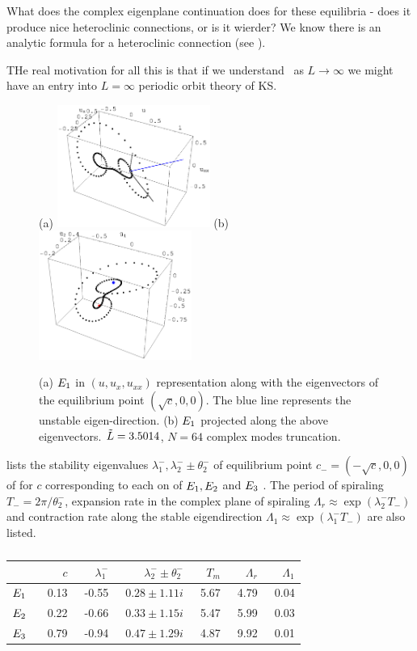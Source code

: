 What does the complex eigenplane continuation does for these
equilibria - does it produce nice heteroclinic connections, or is it
wierder? We know there is an analytic formula for a heteroclinic
connection (see ). %

THe real motivation for all this is that if we understand \eqva\ as
$L \to \infty$ we might have an entry into $L = \infty$ periodic orbit
theory of KS.

\begin{figure}[h]
\centering
(a) \includegraphics[width=5.0cm]{figs/1wSteadyE.eps}
\hspace{0.1in}
(b) \includegraphics[width=5.0cm]{figs/1wSteadyP.eps}
\caption{ 
\small{
(a) $E_{1}$ in $(u,u_x,u_{xx})$ representation along with the eigenvectors of the equilibrium
point $(\sqrt{c},0,0)$. The blue line represents the unstable eigen-direction.
(b) $E_{1}$ projected along the above eigenvectors. $\tilde{L}=3.5014$, $N=64$ complex modes truncation.
}
}
\label{f:1wSteady}
\end{figure}

 lists the stability eigenvalues
$\lambda^-_1,\lambda^-_2\pm\theta^-_2$ of equilibrium point $c_{-}=(-\sqrt{c},0,0)$ 
of \label{eq:3dks} for $c$ corresponding to each on of $E_{1},E_{2}$ and $E_{3}$ \eqva. 
The period of spiraling $T_{-}=2\pi/\theta^-_2$, expansion
rate in the complex plane of spiraling $\Lambda_r\approx\exp(\lambda_2^- T_-)$ and contraction
rate along the stable eigendirection $\Lambda_1\approx\exp(\lambda_1^- T_-)$ are also listed.

\begin{table}[h!]
	\begin{tabular}{l|rrrrrr}
				& $c$	&$\lambda^-_1$	& $\lambda^-_2\pm\theta^-_2$	& $T_m$	& $\Lambda_r$ 	& $\Lambda_1$	\\ \hline
		$\EQV{1}\ $	&\ 0.13	&\ -0.55	&\ $0.28\pm1.11i$		&\ 5.67 	&\ 4.79	 	&\ 0.04	\\ \hline 
		$\EQV{2}\ $ 	&\ 0.22	&\ -0.66	&\ $0.33\pm1.15i$		&\ 5.47 	&\ 5.99  	&\ 0.03	\\ \hline 
		$\EQV{3}\ $ 	&\ 0.79	&\ -0.94	&\ $0.47\pm1.29i$		&\ 4.87 	&\ 9.92  	&\ 0.01
	\end{tabular}
	\caption{}
	\label{tab:L22cminus}
\end{table}




